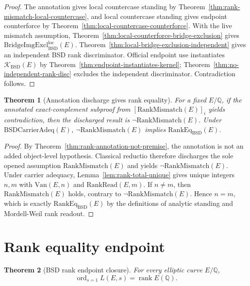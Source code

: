 \documentclass[11pt]{article}
\newtheorem{theorem}{Theorem}[section]
\newcommand{\Q}{\mathbb{Q}}
\newcommand{\rank}{\operatorname{rank}}
\newcommand{\ord}{\operatorname{ord}}
\newcommand{\BSD}{\mathrm{BSD}}
\newcommand{\Van}{\mathrm{Van}}
\newcommand{\RankRead}{\mathrm{RankRead}}
\newcommand{\RankMismatch}{\mathrm{RankMismatch}}
\newcommand{\BridgeImgExclLoc}{\mathrm{BridgeImgExcl}^{\mathrm{loc}}_{\BSD}}
\newcommand{\RankEq}{\mathrm{RankEq}_{\BSD}}
\newcommand{\Kern}{\mathcal{K}}
\begin{document}
\begin{proof}
The annotation gives local countercase standing by Theorem~\ref{thm:rank-mismatch-local-countercase}, and local countercase standing gives endpoint counterforce by Theorem~\ref{thm:local-countercase-counterforce}. With the live mismatch assumption, Theorem~\ref{thm:local-counterforce-bridge-exclusion} gives $\BridgeImgExclLoc(E)$. Theorem~\ref{thm:local-bridge-exclusion-independent} gives an independent BSD rank discriminator. Official endpoint use instantiates $\Kern_{\BSD}(E)$ by Theorem~\ref{thm:endpoint-instantiates-kernel}; Theorem~\ref{thm:no-independent-rank-disc} excludes the independent discriminator. Contradiction follows.
\end{proof}

\begin{theorem}[Annotation discharge gives rank equality]\label{thm:annotation-discharge-rank-eq}
For a fixed $E/\Q$, if the annotated exact-complement subproof from $[\RankMismatch(E)]_i$ yields contradiction, then the discharged result is $\neg\RankMismatch(E)$. Under $\mathrm{BSDCarrierAdeq}(E)$, $\neg\RankMismatch(E)$ implies $\RankEq(E)$.
\end{theorem}

\begin{proof}
By Theorem~\ref{thm:rank-annotation-not-premise}, the annotation is not an added object-level hypothesis. Classical reductio therefore discharges the sole opened assumption $\RankMismatch(E)$ and yields $\neg\RankMismatch(E)$. Under carrier adequacy, Lemma~\ref{lem:rank-total-unique} gives unique integers $n,m$ with $\Van(E,n)$ and $\RankRead(E,m)$. If $n\neq m$, then $\RankMismatch(E)$ holds, contrary to $\neg\RankMismatch(E)$. Hence $n=m$, which is exactly $\RankEq(E)$ by the definitions of analytic standing and Mordell-Weil rank readout.
\end{proof}

\section{Rank equality endpoint}

\begin{theorem}[BSD rank endpoint closure]\label{thm:rank-endpoint}
For every elliptic curve $E/\Q$,
\[
\ord_{s=1}L(E,s)=\rank E(\Q).
\]
\end{theorem}
\end{document}
